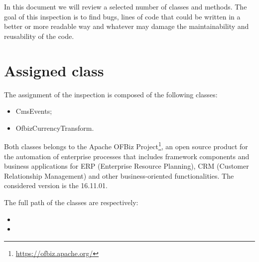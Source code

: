 
In this document we will review a selected number of classes and methods.
The goal of this inspection is to find bugs, lines of code that could be written
in a better or more readable way and whatever may damage the maintainability and reusability of the code.

\section{Assigned class}

The assignment of the inspection is composed of the following classes: 
\begin{itemize}
\item CmsEvents;
\item OfbizCurrencyTransform.
\end{itemize}

Both classes belongs to the Apache OFBiz Project\footnote{\url{https://ofbiz.apache.org/}}, an open source product for the automation of enterprise processes that includes framework components and business applications for
ERP (Enterprise Resource Planning), CRM (Customer Relationship Management) and other business-oriented functionalities. The considered version is the 16.11.01.

The full path of the classes are respectively:

\begin{itemize}
\item {}
\item {}
\end{itemize}